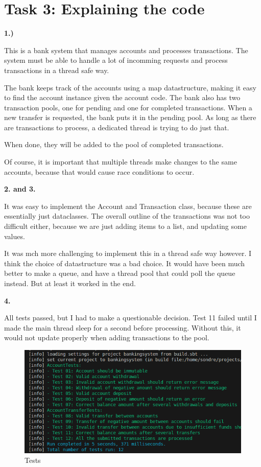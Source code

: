 \documentclass{article}
\begin{document}


\section*{\textbf{Task 3: Explaining the code}}
\vspace*{12pt}\small\textbf{1.)}

This is a bank system that manages accounts and processes transactions. The system must be able to handle a lot of incomming requests and process transactions in a thread safe 
way. 

The bank keeps track of the accounts using a map datastructure, making it easy to find the account instance given the account code.
The bank also has two transaction pools, one for pending and one for completed transactions. When a new transfer is requested, the bank puts it in the pending pool. 
As long as there are transactions to process, a dedicated thread is trying to do just that. 

When done, they will be added to the pool of completed transactions.

Of course, it is important that multiple threads make changes to the same accounts, because that would cause
race conditions to occur. 

\vspace*{12pt}\small\textbf{2. and 3.}

It was easy to implement the Account and Transaction class, because these are essentially just dataclasses. The overall outline of the transactions was not too difficult either, because we are just adding items to a list, and updating some values. 

It was mch more challenging to implement this in a thread safe way however. I think the choice of datastructure was a bad choice. It would have been much better to make 
a queue, and have a thread pool that could poll the queue instead. But at least it worked in the end. 

\vspace*{12pt}\small\textbf{4.}

All tests passed, but I had to make a questionable decision. Test 11 failed until I made the main thread sleep for a second before processing. Without this, it would not update properly when adding 
transactions to the pool. 

\begin{figure}[h]
  \includegraphics[width=\textwidth]{img/test.png}
  \caption{Tests}
\end{figure}
\end{document}
